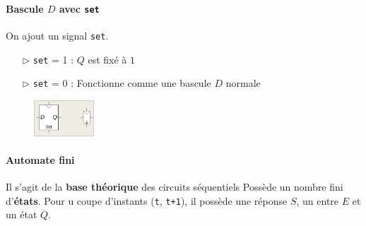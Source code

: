 \documentclass{report}
\begin{document}
\begin{multicols*}{3}
    \paragraph{Bascule $D$ avec \texttt{set}  }
    On ajout un signal \texttt{set}. 
    \begin{itemize}
      \item [$\rhd$ ] \texttt{set} = 1 : $Q$ est fixé à $1$ 
      \item [$\rhd$ ] \texttt{set} = 0 : Fonctionne comme une bascule 
        $D$ normale
    \end{itemize}


    \begin{figure}[H]
      \begin{center}
        \includegraphics[width=0.2\textwidth]{BasculeDSet.png}
      \end{center}
    \end{figure}

    \paragraph{Automate fini}
    Il s'agit de la \textbf{base théorique} des circuits séquentiels  
    Possède un nombre fini d'\textbf{états}. Pour u coupe d'instants 
    (\texttt{t}, \texttt{t+1}), il possède une réponse $S$, un entre 
    $E$ et un état $Q$. 
    



    



    
    
    
   
   
   
   
   

   

   
   


   







  

    

    
    







    \end{multicols*}
\end{document}
